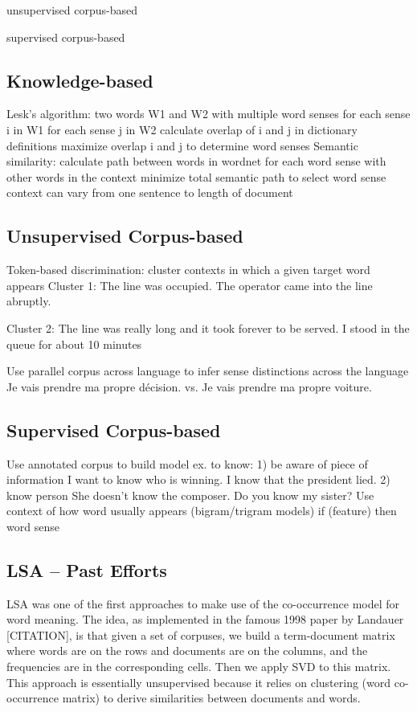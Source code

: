\documentclass[10pt, letterpaper]{article}
\begin{document}
	unsupervised corpus-based

	supervised corpus-based
	\subsection{Knowledge-based}
	Lesk's algorithm:
	two words W1 and W2 with multiple word senses
	for each sense i in W1
	for each sense j in W2
	calculate overlap of i and j in dictionary definitions
	maximize overlap i and j to determine word senses
	Semantic similarity:
	calculate path between words in wordnet for each word sense with other words in the context
	minimize total semantic path to select word sense
	context can vary from one sentence to length of document
	
	\subsection{Unsupervised Corpus-based}
	 Token-based discrimination: cluster contexts in which a given target word appears
	 Cluster 1: The line was occupied. 
	 The operator came into the line abruptly.

	 Cluster 2: The line was really long and it took forever to be served. 
 	 I stood in the queue for about 10 minutes

 	 Use parallel corpus across language to infer sense distinctions across the language
	 Je vais prendre ma propre décision.
	 vs.
	 Je vais prendre ma propre voiture.
	\subsection{Supervised Corpus-based}
	 Use annotated corpus to build model
 	 ex. to know: 1) be aware of piece of information
                              I want to know who is winning.
                              I know that the president lied.
                             2) know person
                             She doesn't know the composer.
                             Do you know my sister?
	 Use context of how word usually appears (bigram/trigram models)
 	 if (feature) then word sense
 	\subsection{LSA -- Past Efforts}
 	LSA was one of the first approaches to make use of the co-occurrence model for word meaning. The idea, as implemented in the famous 1998 paper by Landauer [CITATION], is that given a set of corpuses, we build a term-document matrix where words are on the rows and documents are on the columns, and the frequencies are in the corresponding cells.
	Then we apply SVD to this matrix. 
	This approach is essentially unsupervised because it relies on clustering (word co-occurrence matrix) to derive similarities between documents and words. 
\end{document}
